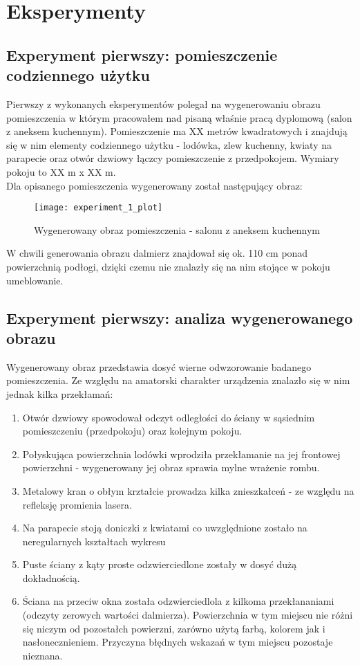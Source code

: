 \section {Eksperymenty}
\subsection {Experyment pierwszy: pomieszczenie codziennego użytku}
Pierwszy z wykonanych eksperymentów polegał na wygenerowaniu obrazu pomieszczenia w którym pracowałem nad pisaną właśnie pracą dyplomową (salon z aneksem kuchennym).
Pomieszczenie ma XX metrów kwadratowych i znajdują się w nim elementy codziennego użytku - lodówka, zlew kuchenny, kwiaty na parapecie oraz otwór dzwiowy łączcy pomieszczenie z przedpokojem. Wymiary pokoju to XX m x XX m.\\


Dla opisanego pomieszczenia wygenerowany został następujący obraz:
\begin{figure}[h]
    \centering
    \texttt{[image: experiment\_1\_plot]}
    \caption{Wygenerowany obraz pomieszczenia - salonu z aneksem kuchennym}
    \label{fig:experiment_1_plot}
\end{figure}

W chwili generowania obrazu dalmierz znajdował się ok. 110 cm ponad powierzchnią podłogi, dzięki czemu nie znalazły się na nim stojące w pokoju umeblowanie.

\subsection {Experyment pierwszy: analiza wygenerowanego obrazu}

Wygenerowany obraz przedstawia dosyć wierne odwzorowanie badanego pomieszczenia. Ze względu na amatorski charakter urządzenia znalazło się w nim jednak kilka przekłamań:

\begin{enumerate}
    \item Otwór dzwiowy spowodował odczyt odległości do ściany w sąsiednim pomieszczeniu (przedpokoju) oraz kolejnym pokoju.
    \item Połyskująca powierzchnia lodówki wprodziła przekłamanie na jej frontowej powierzchni - wygenerowany jej obraz sprawia mylne wrażenie rombu. 
    \item Metalowy kran o obłym krztałcie prowadza kilka znieszkałceń - ze względu na refleksję promienia lasera.
    \item Na parapecie stoją doniczki z kwiatami co uwzględnione zostało na neregularnych kształtach wykresu
    \item Puste ściany z kąty proste odzwierciedlone zostały w dosyć dużą dokładnością.
    \item Ściana na przeciw okna została odzwierciedlola z kilkoma przekłananiami (odczyty zerowych wartości dalmierza). Powierzchnia w tym miejscu nie różni się niczym od pozostałch powierzni, zarówno użytą farbą, kolorem jak i nasłonecznieniem. Przyczyna błędnych wskazań w tym miejscu pozostaje nieznana.
\end{enumerate}

